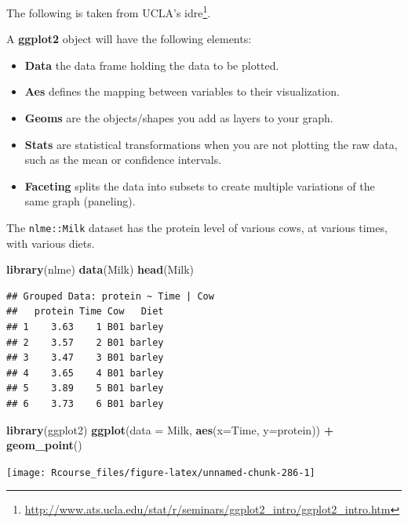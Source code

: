 \documentclass[]{book}
\newenvironment{Shaded}{\begin{snugshade}}{\end{snugshade}}
\newcommand{\DataTypeTok}[1]{\textcolor[rgb]{0.13,0.29,0.53}{#1}}
\newcommand{\KeywordTok}[1]{\textcolor[rgb]{0.13,0.29,0.53}{\textbf{#1}}}
\newcommand{\NormalTok}[1]{#1}
\newcommand{\OperatorTok}[1]{\textcolor[rgb]{0.81,0.36,0.00}{\textbf{#1}}}
\newcommand{\StringTok}[1]{\textcolor[rgb]{0.31,0.60,0.02}{#1}}
\providecommand{\tightlist}{%
  \setlength{\itemsep}{0pt}\setlength{\parskip}{0pt}}
\renewcommand{\href}[2]{#2\footnote{\url{#1}}}
\theoremstyle{definition}
\theoremstyle{definition}
\theoremstyle{definition}
\theoremstyle{remark}
\begin{document}
The following is taken from \href{http://www.ats.ucla.edu/stat/r/seminars/ggplot2_intro/ggplot2_intro.htm}{UCLA's idre}.

A \textbf{ggplot2} object will have the following elements:

\begin{itemize}
\tightlist
\item
  \textbf{Data} the data frame holding the data to be plotted.
\item
  \textbf{Aes} defines the mapping between variables to their visualization.
\item
  \textbf{Geoms} are the objects/shapes you add as layers to your graph.
\item
  \textbf{Stats} are statistical transformations when you are not plotting the raw data, such as the mean or confidence intervals.
\item
  \textbf{Faceting} splits the data into subsets to create multiple variations of the same graph (paneling).
\end{itemize}

The \texttt{nlme::Milk} dataset has the protein level of various cows, at various times, with various diets.

\begin{Shaded}
\begin{Highlighting}[]
\KeywordTok{library}\NormalTok{(nlme)}
\KeywordTok{data}\NormalTok{(Milk)}
\KeywordTok{head}\NormalTok{(Milk)}
\end{Highlighting}
\end{Shaded}

\begin{verbatim}
## Grouped Data: protein ~ Time | Cow
##   protein Time Cow   Diet
## 1    3.63    1 B01 barley
## 2    3.57    2 B01 barley
## 3    3.47    3 B01 barley
## 4    3.65    4 B01 barley
## 5    3.89    5 B01 barley
## 6    3.73    6 B01 barley
\end{verbatim}

\begin{Shaded}
\begin{Highlighting}[]
\KeywordTok{library}\NormalTok{(ggplot2)}
\KeywordTok{ggplot}\NormalTok{(}\DataTypeTok{data =}\NormalTok{ Milk, }\KeywordTok{aes}\NormalTok{(}\DataTypeTok{x=}\NormalTok{Time, }\DataTypeTok{y=}\NormalTok{protein)) }\OperatorTok{+}
\StringTok{  }\KeywordTok{geom_point}\NormalTok{()}
\end{Highlighting}
\end{Shaded}

\texttt{[image: Rcourse\_files/figure-latex/unnamed-chunk-286-1]}
\end{document}
